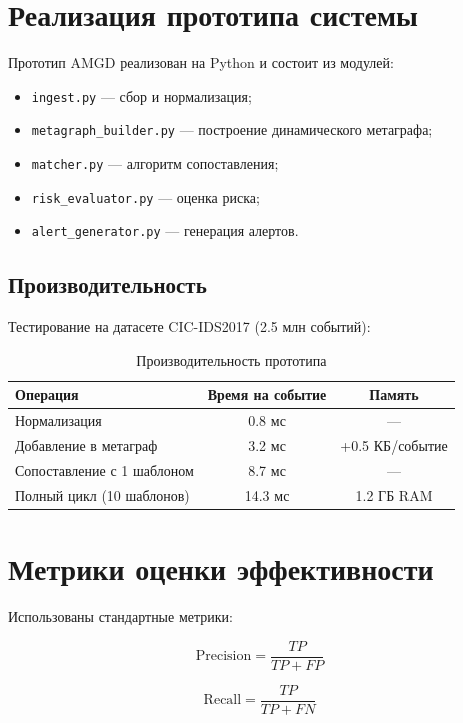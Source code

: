 \section{Реализация прототипа системы}

Прототип AMGD реализован на Python и состоит из модулей:
\begin{itemize}
    \item \texttt{ingest.py} — сбор и нормализация;
    \item \texttt{metagraph\_builder.py} — построение динамического метаграфа;
    \item \texttt{matcher.py} — алгоритм сопоставления;
    \item \texttt{risk\_evaluator.py} — оценка риска;
    \item \texttt{alert\_generator.py} — генерация алертов.
\end{itemize}
\subsection{Производительность}

Тестирование на датасете CIC-IDS2017 (2.5 млн событий):

\begin{table}[h]
\centering
\caption{Производительность прототипа}
\label{tab:performance}
\begin{tabular}{lcc}
\toprule
Операция & Время на событие & Память \\
\midrule
Нормализация & 0.8 мс & — \\
Добавление в метаграф & 3.2 мс & +0.5 КБ/событие \\
Сопоставление с 1 шаблоном & 8.7 мс & — \\
Полный цикл (10 шаблонов) & 14.3 мс & 1.2 ГБ RAM \\
\bottomrule
\end{tabular}
\end{table}

\section{Метрики оценки эффективности}

Использованы стандартные метрики:

\begin{equation}
\text{Precision} = \frac{TP}{TP + FP}
\label{eq:precision}
\end{equation}

\begin{equation}
\text{Recall} = \frac{TP}{TP + FN}
\label{eq:recall}
\end{equation}

